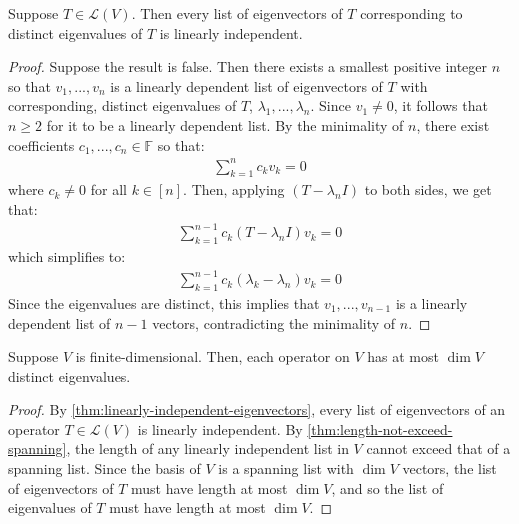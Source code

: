 \documentclass{article}
\begin{document}
\begin{theorem}
  \label{thm:linearly-independent-eigenvectors}
  Suppose $T \in \mathcal{L}(V)$. Then every list of eigenvectors of
  $T$ corresponding to distinct eigenvalues of $T$ is linearly independent.
\end{theorem}
\begin{proof}
  Suppose the result is false. Then there exists a smallest positive integer
  $n$ so that $v_1, ..., v_n$ is a linearly dependent list of
  eigenvectors of $T$ with corresponding, distinct eigenvalues of $T$,
  $\lambda_1, ..., \lambda_n$. Since $v_1 \ne 0$, it follows that $n
  \ge 2$ for it to be a linearly dependent list. By the minimality of
  $n$, there exist coefficients $c_1, ..., c_n \in \mathbb{F}$ so that:
  \begin{align*}
    \sum_{k=1}^n c_k v_k = 0
  \end{align*}
  where $c_k \ne 0$ for all $k \in [n]$. Then, applying $(T -
  \lambda_n I)$ to both sides, we get that:
  \begin{align*}
    \sum_{k=1}^{n-1}c_k (T - \lambda_n I) v_k = 0
  \end{align*}
  which simplifies to:
  \begin{align*}
    \sum_{k=1}^{n-1} c_k (\lambda_k - \lambda_n) v_k = 0
  \end{align*}
  Since the eigenvalues are distinct, this implies that $v_1, ...,
  v_{n-1}$ is a linearly dependent list of $n - 1$ vectors,
  contradicting the minimality of $n$.
\end{proof}

\begin{theorem}
  \label{thm:operator-cannot-have-more-eigenvalues-than-dimension-of-vector-space}
  Suppose $V$ is finite-dimensional. Then, each operator on $V$ has at
  most $\dim V$ distinct eigenvalues.
\end{theorem}
\begin{proof}
  By \cref{thm:linearly-independent-eigenvectors}, every list of
  eigenvectors of an operator $T \in \mathcal{L}(V)$ is linearly
  independent. By \cref{thm:length-not-exceed-spanning}, the length of
  any linearly independent list in $V$ cannot exceed that of a
  spanning list. Since the basis of $V$ is a spanning list with $\dim
  V$ vectors, the list of eigenvectors of $T$ must have length at most
  $\dim V$, and so the list of eigenvalues of $T$ must have length at
  most $\dim V$.
\end{proof}
\end{document}
